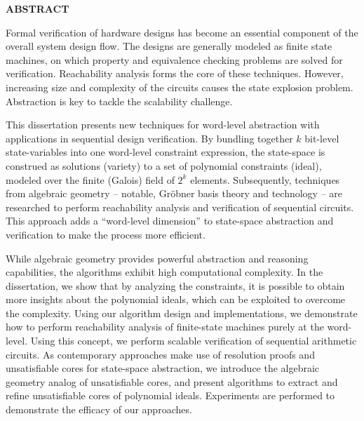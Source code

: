 \begin{center}{\bf ABSTRACT}\end{center}
Formal verification of hardware designs has become an essential
component of the overall system design flow. The designs are generally
modeled as finite state machines, on which property and equivalence
checking problems are solved for verification. Reachability analysis
forms the core of these techniques. However, increasing
size and complexity of the circuits causes the state explosion
problem. Abstraction is key to tackle the scalability challenge.

This dissertation presents new techniques for word-level abstraction
with applications in sequential design verification. By bundling
together $k$ bit-level state-variables into one word-level constraint 
expression, the state-space is construed as solutions (variety) to
a set of polynomial constraints (ideal), modeled over the finite
(Galois) field of $2^k$ elements. Subsequently, techniques from
algebraic geometry -- notable, Gr\"obner basis theory and technology
-- are researched to perform reachability analysis and
verification of sequential circuits. This approach adds a ``word-level
dimension'' to state-space abstraction and verification to make the
process more efficient.

While algebraic geometry provides powerful abstraction and reasoning
capabilities, the algorithms exhibit high computational complexity. In
the dissertation, we show that by analyzing the constraints, it is
possible to obtain more insights about the polynomial ideals, which can be
exploited to overcome the complexity. Using our algorithm design and
implementations, we demonstrate how to perform reachability
analysis of finite-state machines purely at the word-level. Using this
concept, we perform scalable verification of sequential arithmetic
circuits. As contemporary approaches make use of resolution proofs and
unsatisfiable cores for state-space abstraction, we introduce the
algebraic geometry analog of unsatisfiable cores, and present
algorithms to extract and refine unsatisfiable cores of polynomial
ideals. Experiments are performed to demonstrate the efficacy of our
approaches. 
